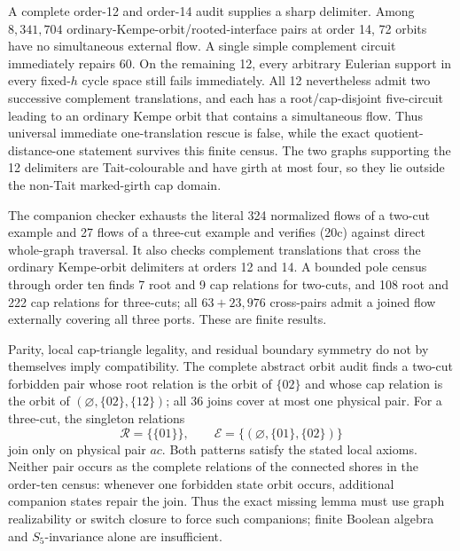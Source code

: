 \documentclass[11pt]{article}
\theoremstyle{definition}
\theoremstyle{remark}
\begin{document}
A complete order-12 and order-14 audit supplies a sharp delimiter.  Among
\(8{,}341{,}704\) ordinary-Kempe-orbit/rooted-interface pairs at order 14,
72 orbits have no simultaneous external flow.  A single simple complement
circuit immediately repairs 60.  On the remaining 12, every arbitrary
Eulerian support in every fixed-\(h\) cycle space still fails immediately.
All 12 nevertheless admit two successive complement translations, and each
has a root/cap-disjoint five-circuit leading to an ordinary Kempe orbit that
contains a simultaneous flow.  Thus universal immediate one-translation
rescue is false, while the exact quotient-distance-one statement survives
this finite census.  The two graphs supporting the 12 delimiters are
Tait-colourable and have girth at most four, so they lie outside the
non-Tait marked-girth cap domain.

The companion checker exhausts the literal 324 normalized flows of a
two-cut example and 27 flows of a three-cut example and verifies (20c)
against direct whole-graph traversal.  It also checks complement translations
that cross the ordinary Kempe-orbit delimiters at orders 12 and 14.  A
bounded pole census through order ten finds 7 root and 9 cap relations for
two-cuts, and 108 root and 222 cap relations for three-cuts; all
\(63+23{,}976\) cross-pairs admit a joined flow externally covering all
three ports.  These are finite results.

Parity, local cap-triangle legality, and residual boundary symmetry do not
by themselves imply compatibility.  The complete abstract orbit audit
finds a two-cut forbidden pair whose root relation is the orbit of
\(\{02\}\) and whose cap relation is the orbit of
\((\varnothing,\{02\},\{12\})\); all 36 joins cover at most one physical
pair.  For a three-cut, the singleton relations
\[
       \mathcal R=\{\{01\}\},\qquad
       \mathcal E=\{(\varnothing,\{01\},\{02\})\}           \tag{20f}
\]
join only on physical pair \(ac\).  Both patterns satisfy the stated local
axioms.  Neither pair occurs as the complete relations of the connected
shores in the order-ten census: whenever one forbidden state orbit occurs,
additional companion states repair the join.  Thus the exact missing lemma
must use graph realizability or switch closure to force such companions;
finite Boolean algebra and \(S_5\)-invariance alone are insufficient.
\end{document}

